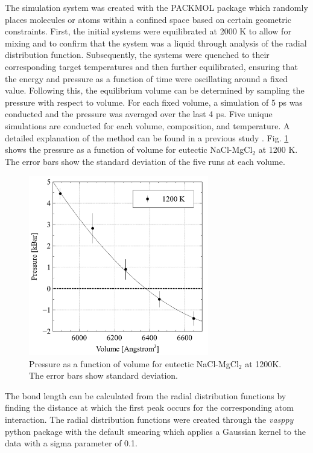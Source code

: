 \documentclass[review]{elsarticle}
\begin{document}
The simulation system was created with the PACKMOL package \cite{martinez2009} which randomly places molecules or atoms within a confined space based on certain geometric constraints. First, the initial systems were equilibrated at 2000 K to allow for mixing and to confirm that the system was a liquid through analysis of the radial distribution function. Subsequently, the systems were quenched to their corresponding target temperatures and then further equilibrated, ensuring that the energy and pressure as a function of time were oscillating around a fixed value. Following this, the equilibrium volume can be determined by sampling the pressure with respect to volume. For each fixed volume, a simulation of 5 ps was conducted and the pressure was averaged over the last 4 ps. Five unique simulations are conducted for each volume, composition, and temperature. A detailed explanation of the method can be found in a previous study \cite{Duemmler2021}. Fig. \ref{fig:PVV} shows the pressure as a function of volume for eutectic NaCl-MgCl$_2$ at 1200 K. The error bars show the standard deviation of the five runs at each volume.

\begin{figure}[h]
 \centering
 \includegraphics[width=0.7\textwidth]{PressureVsVolume.jpg} 
 \caption{Pressure as a function of volume for eutectic NaCl-MgCl$_2$ at 1200K. The error bars show standard deviation.}
 \label{fig:PVV}
\end{figure} 

The bond length can be calculated from the radial distribution functions by finding the distance at which the first peak occurs for the corresponding atom interaction. The radial distribution functions were created through the \textit{vasppy} python package with the default smearing which applies a Gaussian kernel to the data with a sigma parameter of 0.1. 
\end{document}
